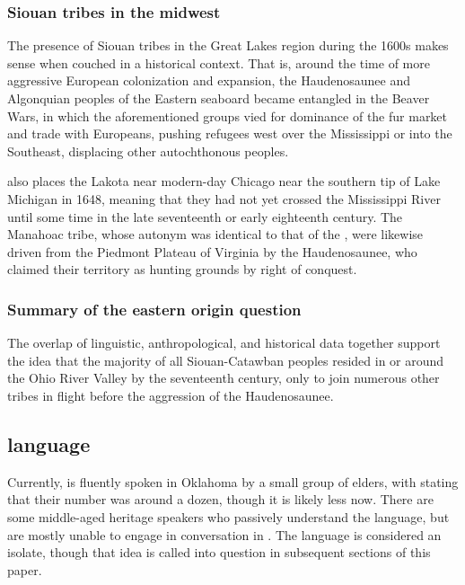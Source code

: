 \documentclass[output=paper]{LSP/langsci}
\begin{document}
\subsubsection{Siouan tribes in the midwest}

The presence of Siouan tribes in the Great Lakes region during the 1600s makes sense when couched in a historical context. That is, around the time of more aggressive European colonization and expansion, the Haudenosaunee and Algonquian peoples of the Eastern seaboard became entangled in the Beaver Wars, in which the aforementioned groups vied for dominance of the fur market and trade with Europeans, pushing refugees west over the Mississippi or into the Southeast, displacing other autochthonous peoples. 

\citet{Jennings1990} also places the Lakota near modern-day Chicago near the southern tip of Lake Michigan in 1648, meaning that they had not yet crossed the Mississippi River until some time in the late seventeenth or early eighteenth century. The Manahoac tribe, whose autonym was identical to that of the , were likewise driven from the Piedmont Plateau of Virginia by the Haudenosaunee, who claimed their territory as hunting grounds by right of conquest.

\subsubsection{Summary of the eastern origin question} 

The overlap of linguistic, anthropological, and historical data together support the idea that the majority of all Siouan-Catawban peoples resided in or around the Ohio River Valley by the seventeenth century, only to join numerous other tribes in flight before the aggression of the Haudenosaunee.

\subsection{ language}

Currently,  is fluently spoken in Oklahoma by a small group of elders, with \citet{Linn2000} stating that their number was around a dozen, though it is likely less now. There are some middle-aged heritage speakers who passively understand the language, but are mostly unable to engage in conversation in . The language is considered an isolate, though that idea is called into question in subsequent sections of this paper.
\end{document}
